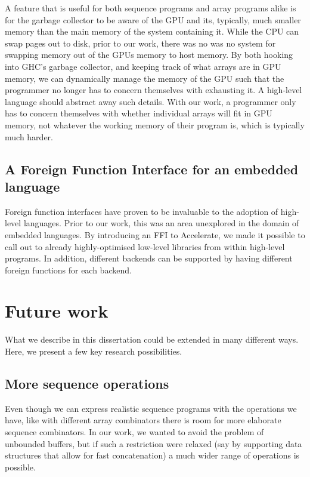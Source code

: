 A feature that is useful for both sequence programs and array programs alike is for the garbage collector to be aware of the GPU and its, typically, much smaller memory than the main memory of the system containing it. While the CPU can swap pages out to disk, prior to our work, there was no was no system for swapping memory out of the GPUs memory to host memory. By both hooking into GHC's garbage collector, and keeping track of what arrays are in GPU memory, we can dynamically manage the memory of the GPU such that the programmer no longer has to concern themselves with exhausting it. A high-level language should abstract away such details. With our work, a programmer only has to concern themselves with whether individual arrays will fit in GPU memory, not whatever the working memory of their program is, which is typically much harder.

\subsection{A Foreign Function Interface for an embedded language}

Foreign function interfaces have proven to be invaluable to the adoption of high-level languages\cite{Chakravarty:haskell-ffi}. Prior to our work, this was an area unexplored in the domain of embedded languages. By introducing an FFI to Accelerate, we made it possible to call out to already highly-optimised low-level libraries from within high-level programs. In addition, different backends can be supported by having different foreign functions for each backend.

\section{Future work}

What we describe in this dissertation could be extended in many different ways. Here, we present a few key research possibilities.

\subsection{More sequence operations}

Even though we can express realistic sequence programs with the operations we have, like with different array combinators there is room for more elaborate sequence combinators. In our work, we wanted to avoid the problem of unbounded buffers, but if such a restriction were relaxed (say by supporting data structures that allow for fast concatenation) a much wider range of operations is possible.

